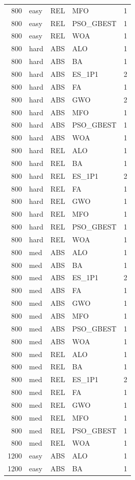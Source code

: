 \begin{tabular}{r l l l l}
800 & easy & REL & MFO & 1 \\
800 & easy & REL & PSO_GBEST & 1 \\
800 & easy & REL & WOA & 1 \\
800 & hard & ABS & ALO & 1 \\
800 & hard & ABS & BA & 1 \\
800 & hard & ABS & ES_1P1 & 2 \\
800 & hard & ABS & FA & 1 \\
800 & hard & ABS & GWO & 2 \\
800 & hard & ABS & MFO & 1 \\
800 & hard & ABS & PSO_GBEST & 1 \\
800 & hard & ABS & WOA & 1 \\
800 & hard & REL & ALO & 1 \\
800 & hard & REL & BA & 1 \\
800 & hard & REL & ES_1P1 & 2 \\
800 & hard & REL & FA & 1 \\
800 & hard & REL & GWO & 1 \\
800 & hard & REL & MFO & 1 \\
800 & hard & REL & PSO_GBEST & 1 \\
800 & hard & REL & WOA & 1 \\
800 & med & ABS & ALO & 1 \\
800 & med & ABS & BA & 1 \\
800 & med & ABS & ES_1P1 & 2 \\
800 & med & ABS & FA & 1 \\
800 & med & ABS & GWO & 1 \\
800 & med & ABS & MFO & 1 \\
800 & med & ABS & PSO_GBEST & 1 \\
800 & med & ABS & WOA & 1 \\
800 & med & REL & ALO & 1 \\
800 & med & REL & BA & 1 \\
800 & med & REL & ES_1P1 & 2 \\
800 & med & REL & FA & 1 \\
800 & med & REL & GWO & 1 \\
800 & med & REL & MFO & 1 \\
800 & med & REL & PSO_GBEST & 1 \\
800 & med & REL & WOA & 1 \\
1200 & easy & ABS & ALO & 1 \\
1200 & easy & ABS & BA & 1 \\

\end{tabular}

